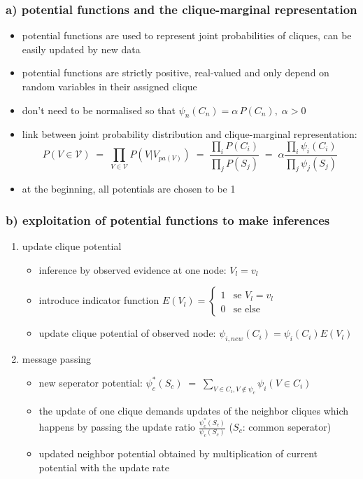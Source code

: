 \documentclass[10 pt]{beamer}
\begin{document}
\begin{frame}
  \frametitle{a) potential functions and the clique-marginal representation}

\begin{itemize}
\item potential functions are used to represent joint probabilities of cliques, can be easily updated by new data
\item potential functions are strictly positive, real-valued and only depend on random variables in their assigned clique
\item don't need to be normalised so that $\psi_n(C_n) = \alpha\,P(C_n),\;\alpha>0$
\item link between joint probability distribution and clique-marginal representation:
\begin{equation}
P(V \in \mathcal{V})\;=\;\prod_{V \in \mathcal{V}} P(V|V_{pa(V)})\;=\;\frac{\prod_i P(C_i)}{\prod_j P(S_j)}\;=\; \alpha \frac{\prod_i \psi_i(C_i)}{\prod_j \psi_j(S_j)}
\end{equation}
\item at the beginning, all potentials are chosen to be 1
\end{itemize}


\end{frame}
\begin{frame}
  \frametitle{b) exploitation of potential functions to make inferences}
\begin{enumerate}
\item update clique potential
\begin{itemize}
  \item inference by observed evidence at one node: $V_l=v_l$
  \item introduce indicator function $E(V_l) = \begin{cases}
                                                  1 &\text{se $V_l = v_l$}\\
                                                  0 &\text{se else}
                                                  \end{cases}$
  \item update clique potential of observed node: $\psi_{i,new}(C_i)=\psi_{i}(C_i)E(V_l)$
\end{itemize}
\item message passing
\begin{itemize}
  \item new seperator potential: $ \psi_c^*(S_c)\;=\; \sum_{V \in C_i, V \notin \psi_c} \psi_i(V \in C_i) $
  \item the update of one clique demands updates of the neighbor cliques which happens by passing the update ratio $\frac{\psi_c^*(S_c)}{\psi_c(S_c)}$ ($S_c$: common seperator)
  \item updated neighbor potential obtained by multiplication of current potential with the update rate
\end{itemize}
\end{enumerate}
\end{frame}
\end{document}
